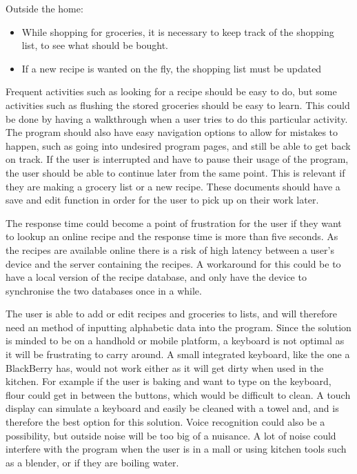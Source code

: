 Outside the home:
\begin{itemize}
\item While shopping for groceries, it is necessary to keep track of the shopping list, to see what should be bought.
\item If a new recipe is wanted on the fly, the shopping list must be updated
\end{itemize}

Frequent activities such as looking for a recipe should be easy to do, but some activities such as flushing the stored groceries should be easy to learn. This could be done by having a walkthrough when a user tries to do this particular activity. The program should also have easy navigation options to allow for mistakes to happen, such as going into undesired program pages, and still be able to get back on track. If the user is interrupted and have to pause their usage of the program, the user should be able to continue later from the same point. This is relevant if they are making a grocery list or a new recipe. These documents should have a save and edit function in order for the user to pick up on their work later.

The response time could become a point of frustration for the user if they want to lookup an online recipe and the response time is more than five seconds. As the recipes are available online there is a risk of high latency between a user's device and the server containing the recipes. A workaround for this could be to have a local version of the recipe database, and only have the device to synchronise the two databases once in a while.

The user is able to add or edit recipes and groceries to lists, and will therefore need an method of inputting alphabetic data into the program. Since the solution is minded to be on a handhold or mobile platform, a keyboard is not optimal as it will be frustrating to carry around. A small integrated keyboard, like the one a BlackBerry has\cite{blakBerry}, would not work either as it will get dirty when used in the kitchen. For example if the user is baking and want to type on the keyboard, flour could get in between the buttons, which would be difficult to clean. A touch display can simulate a keyboard and easily be cleaned with a towel and, and is therefore the best option for this solution. Voice recognition could also be a possibility, but outside noise will be too big of a nuisance. A lot of noise could interfere with the program when the user is in a mall or using kitchen tools such as a blender, or if they are boiling water.